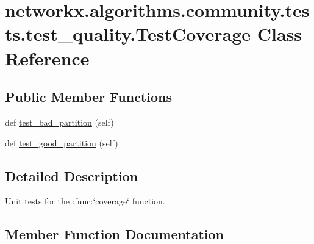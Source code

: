 \hypertarget{classnetworkx_1_1algorithms_1_1community_1_1tests_1_1test__quality_1_1TestCoverage}{}\section{networkx.\+algorithms.\+community.\+tests.\+test\+\_\+quality.\+Test\+Coverage Class Reference}
\label{classnetworkx_1_1algorithms_1_1community_1_1tests_1_1test__quality_1_1TestCoverage}
\subsection*{Public Member Functions}
\begin{DoxyCompactItemize}
\item 
def \hyperlink{classnetworkx_1_1algorithms_1_1community_1_1tests_1_1test__quality_1_1TestCoverage_ae7999e1db54b66c94417605b18cbf079}{test\+\_\+bad\+\_\+partition} (self)
\item 
def \hyperlink{classnetworkx_1_1algorithms_1_1community_1_1tests_1_1test__quality_1_1TestCoverage_a8403f26c715e79f382e825928479e507}{test\+\_\+good\+\_\+partition} (self)
\end{DoxyCompactItemize}


\subsection{Detailed Description}
\begin{DoxyVerb}Unit tests for the :func:`coverage` function.\end{DoxyVerb}
 

\subsection{Member Function Documentation}
\mbox{\label{classnetworkx_1_1algorithms_1_1community_1_1tests_1_1test__quality_1_1TestCoverage_ae7999e1db54b66c94417605b18cbf079}} 

